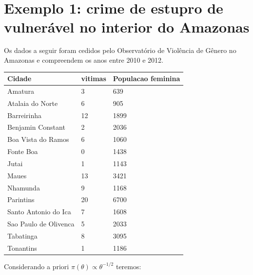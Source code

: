 \documentclass[
  letterpaper,
  DIV=11,
  numbers=noendperiod]{scrreprt}
\theoremstyle{definition}
\theoremstyle{definition}
\theoremstyle{plain}
\theoremstyle{remark}
\begin{document}
\section{Exemplo 1: crime de estupro de vulnerável no interior do
Amazonas}\label{exemplo-1-crime-de-estupro-de-vulneruxe1vel-no-interior-do-amazonas}

Os dados a seguir foram cedidos pelo Observatório de Violência de Gênero
no Amazonas e compreendem os anos entre 2010 e 2012.

\begin{longtable}[]{@{}lll@{}}
\toprule\noalign{}
Cidade & vitimas & Populacao feminina \\
\midrule\noalign{}
\endhead
\bottomrule\noalign{}
\endlastfoot
Amatura & 3 & 639 \\
Atalaia do Norte & 6 & 905 \\
Barreirinha & 12 & 1899 \\
Benjamin Constant & 2 & 2036 \\
Boa Vista do Ramos & 6 & 1060 \\
Fonte Boa & 0 & 1438 \\
Jutai & 1 & 1143 \\
Maues & 13 & 3421 \\
Nhamunda & 9 & 1168 \\
Parintins & 20 & 6700 \\
Santo Antonio do Ica & 7 & 1608 \\
Sao Paulo de Olivenca & 5 & 2033 \\
Tabatinga & 8 & 3095 \\
Tonantins & 1 & 1186 \\
\end{longtable}

Considerando a priori \(\pi(\theta)\varpropto \theta^{-1/2}\) teremos:
\end{document}
